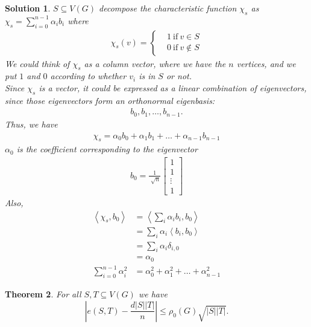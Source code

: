 \documentclass[12pt]{article}%
\newtheorem{theorem}{Theorem}
\newtheorem{solution}[theorem]{Solution}
\begin{document}
\begin{solution}
    $S \subseteq V(G)$ decompose the characteristic function $\chi_s$
    as $\chi_s = \sum_{i=0}^{n-1} \alpha_i b_i$ where
    \begin{align}
        \chi_s (v) = \begin{cases}
            &1 \ \text{if} \ v \in S\\
            &0 \ \text{if} \ v \not\in S
        \end{cases}
    \end{align}
    We could think of $\chi_s$ as a column vector, 
    where we have the $n$ vertices, and we put 
    $1$ and $0$ according to whether $v_i$ is 
    in $S$ or not.\\
    Since $\chi_s$ is a vector, it could be 
    expressed as a linear combination of eigenvectors, 
    since those eigenvectors form an orthonormal eigenbasis:
    \begin{align}
        b_0, b_1, \ldots, b_{n-1}.
    \end{align}
    Thus, we have
    \begin{align}
        \chi_s = \alpha_0 b_0 + \alpha_1 b_1 + \ldots + \alpha_{n-1} b_{n-1}
    \end{align}
    $\alpha_0$ is the coefficient corresponding to the eigenvector
    \begin{align}
        b_0 = \frac{ 1 }{ \sqrt[]{n} }
        \begin{bmatrix}
            1\\
            1\\
            \vdots\\
            1
        \end{bmatrix}
    \end{align}
    Also, 
    \begin{align}
        \left\langle \chi_s, b_0 \right\rangle &= \left\langle \sum_i \alpha_i b_i, b_0 \right\rangle\\
        &= \sum_i \alpha_i \left\langle b_i, b_0 \right\rangle\\
        &= \sum_i \alpha_i \delta_{i,0}\\
        &= \alpha_0 \\
        \sum_{i=0}^{n-1} \alpha_i^2 &= \alpha_0^2 + \alpha_1^2 + \ldots + \alpha_{n-1}^2
    \end{align}

    
\end{solution}

\begin{theorem}
For all $S,T\subseteq V(G)$ we have
\[
\left\vert e(S,T)-\frac{d\left\vert S\right\vert \left\vert T\right\vert }%
{n}\right\vert \leq\rho_{0}(G)\sqrt{\left\vert S\right\vert \left\vert
T\right\vert }\text{.}%
\]

\end{theorem}
\end{document}
